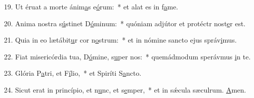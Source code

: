 19. Ut éruat a morte ánim\uline{a}s e\uline{ó}rum:~* et alat es in f\uline{a}me.\par 
20. Anima nostra s\uline{ú}stinet D\uline{ó}minum:~* quóniam adjútor et protéctr nost\uline{e}r est.\par 
21. Quia in eo lætábit\uline{u}r cor n\uline{o}strum:~* et in nómine sancto ejus správ\uline{i}mus.\par 
22. Fiat misericórdia tua, D\uline{ó}mine, s\uline{u}per nos:~* quemádmodum sperávmus \uline{i}n te.\par 
23. Glória P\uline{a}tri, et F\uline{í}lio,~* et Spiríti S\uline{a}ncto.\par 
24. Sicut erat in princípio, et n\uline{u}nc, et s\uline{e}mper,~* et in sǽcula sæculrum. \uline{A}men.\par 

